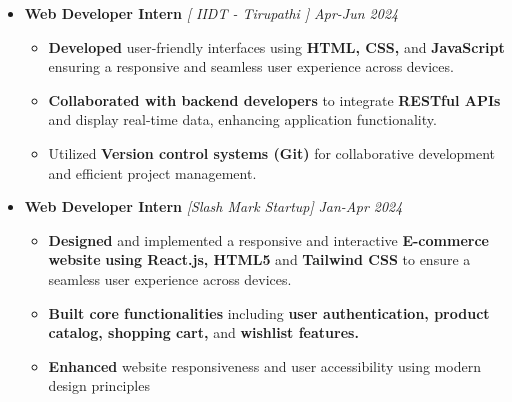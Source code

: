 \documentclass[a4paper,10pt]{article}
\begin{document}
\begin{itemize}

\vspace{-0.5mm}
\item {\bf Web Developer Intern } \textit{[ IIDT - Tirupathi ]}
\textit{\hfill 
{Apr-Jun 2024}
}
\vspace{-1mm}

\begin{itemize}






\item \textbf{Developed} user-friendly interfaces using \textbf{ HTML, CSS,} and \textbf {JavaScript} ensuring a responsive and seamless user experience across devices.

\item \textbf{Collaborated with backend developers } to integrate \textbf{RESTful APIs} and display real-time data, enhancing application functionality.

\item Utilized \textbf{Version control systems (Git)} for collaborative development and efficient project management.

\vspace{-1mm}

\end{itemize}
\end{itemize}

\begin{itemize}

\vspace{-1mm}
\item {\bf Web Developer Intern} \textit{[Slash Mark Startup]}
\textit{\hfill 
{Jan-Apr 2024}
}
\vspace{-1mm}

\begin{itemize}



\item \textbf{Designed } and implemented a responsive and interactive \textbf{E-commerce website} \textbf{using React.js, HTML5 } and \textbf{Tailwind CSS} to ensure a seamless user experience across devices.

\item \textbf{Built core functionalities } including \textbf{user authentication, product catalog, shopping cart,} and \textbf{wishlist features.
}


\item \textbf{Enhanced} website responsiveness and user accessibility using modern design principles

\vspace{-1mm}
\end{itemize}
\end{itemize}
\end{document}
